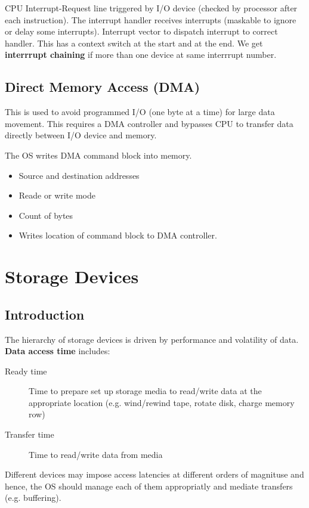 \documentclass[11pt]{article}
\begin{document}
CPU Interrupt-Request line triggered by I/O device (checked by processor after each instruction).
The interrupt handler receives interrupts (maskable to ignore or delay some interrupts).
Interrupt vector to dispatch interrupt to correct handler.
This has a context switch at the start and at the end.
We get \textbf{interrrupt chaining} if more than one device at same interrrupt number.

\subsection{Direct Memory Access (DMA)}
\label{sec:org0663fe1}
This is used to avoid programmed I/O (one byte at a time) for large data movement.
This requires a DMA controller and bypasses CPU to transfer data directly between I/O device and memory.

The OS writes DMA command block into memory.
\begin{itemize}
\item Source and destination addresses
\item Reade or write mode
\item Count of bytes
\item Writes location of command block to DMA controller.
\end{itemize}

\section{Storage Devices}
\label{sec:orgcb2dc60}
\subsection{Introduction}
\label{sec:org2dc4b27}
The hierarchy of storage devices is driven by performance and volatility of data.
\textbf{Data access time} includes:
\begin{description}
\item[{Ready time}] Time to prepare set up storage media to read/write data at the appropriate location (e.g. wind/rewind tape, rotate disk, charge memory row)
\item[{Transfer time}] Time to read/write data from media
\end{description}
Different devices may impose access latencies at different orders of magnituse and hence, the OS should manage each of them appropriatly and mediate transfers (e.g. buffering).
\end{document}
